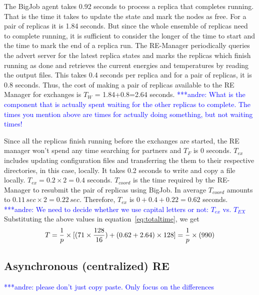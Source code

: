 \documentclass{rspublic}
\newcommand{\alnote}[1]{ {\textcolor{blue} { ***andre: #1 }}}
\newcommand{\alnote}[1]{}
\begin{document}
The BigJob agent takes 0.92 seconds to process a replica that completes running. 
That is the time it takes to update the state and
mark the nodes as free. For a pair of replicas it is 1.84 seconds. But since the 
whole ensemble of replicas need to complete running, it is sufficient to 
consider the longer of the time to start and the time to mark the end of a replica run.
The RE-Manager periodically queries
the advert server for the latest replica states and marks the replicas
which finish running as done and retrieves the current energies and
temperatures by reading the output files. This takes 0.4 seconds per
replica and for a pair of replicas, it is 0.8 seconds. 
Thus, the cost of making a pair of replicas available to the RE Manager 
for exchanges is $T_W$ = 1.84+0.8=2.64 seconds. 
\alnote{What is the component that is actually spent waiting for the other replicas
to complete. The times you mention above are times for actually doing something, but
not waiting times!}

Since all the replicas finish running before
the exchanges are started, the RE manager won't spend any time
searching for partners and $T_F$ is 0 seconds. $T_{ex}$ includes
updating configuration files and transferring the them to their
respective directories, in this case, locally. It takes 0.2 seconds to
write and copy a file locally. $T_{ex} = 0.2 \times 2=0.4$
seconds. $T_{coord}$ is the time required by the RE-Manager to resubmit 
the pair of replicas using BigJob. In average $T_{coord}$ amounts to 
$0.11\,sec \times 2 = 0.22\,sec$. Therefore, $T_{ex}$ is $0+0.4+0.22=0.62$ seconds.
\alnote{We need to decide whether we use capital letters or not: $T_{ex}$ vs. $T_{EX}$}
Substituting the above values in equation~\ref{eq:totaltime}, we get
\begin{eqnarray}
T=  {1 \over p} \times {[ {(71\times {128\over 16}})+ (0.62 + 2.64)\times 128]} = {1 \over p} \times (990)
\label{eq:sync}
\end{eqnarray}


\subsection{Asynchronous (centralized) RE}
\alnote{please don't just copy paste. Only focus on the differences}

\end{document}
